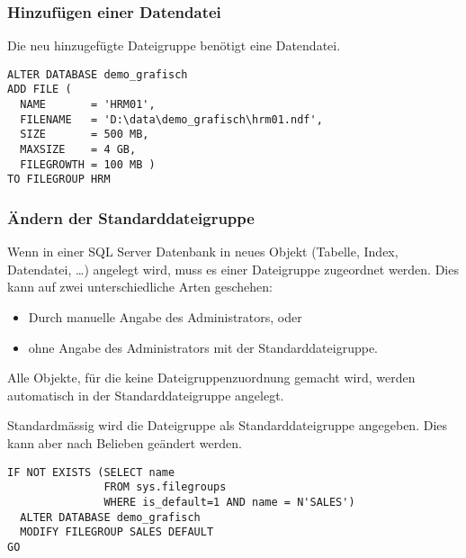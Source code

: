         \subsubsection{Hinzufügen einer Datendatei}
          Die neu hinzugefügte Dateigruppe  benötigt eine
          Datendatei.
          \begin{lstlisting}[language=ms_sql,caption={Eine
          Datendatei einer Dateigruppe hinzufügen},label=admin03_13]
ALTER DATABASE demo_grafisch
ADD FILE ( 
  NAME       = 'HRM01', 
  FILENAME   = 'D:\data\demo_grafisch\hrm01.ndf', 
  SIZE       = 500 MB, 
  MAXSIZE    = 4 GB, 
  FILEGROWTH = 100 MB ) 
TO FILEGROUP HRM
          \end{lstlisting}
          \begin{literaturinternet}
            \item \cite{bb522469}
          \end{literaturinternet}
        \subsubsection{Ändern der Standarddateigruppe}
          Wenn in einer SQL Server Datenbank in neues Objekt (Tabelle, Index,
          Datendatei, \ldots) angelegt wird, muss es einer Dateigruppe
          zugeordnet werden. Dies kann auf zwei unterschiedliche Arten
          geschehen:
          \begin{itemize}
              \item Durch manuelle Angabe des Administrators, oder
              \item ohne Angabe des Administrators mit der Standarddateigruppe.
          \end{itemize}
          \begin{merke}
            Alle Objekte, für die keine Dateigruppenzuordnung gemacht wird,
            werden automatisch in der Standarddateigruppe angelegt.
          \end{merke}
          Standardmässig wird die Dateigruppe  als
          Standarddateigruppe angegeben. Dies kann aber nach Belieben geändert
          werden.
\clearpage
          \begin{lstlisting}[language=ms_sql,caption={Ändern
          der Standarddateigruppe},label=admin03_14]
IF NOT EXISTS (SELECT name 
               FROM sys.filegroups 
               WHERE is_default=1 AND name = N'SALES')
  ALTER DATABASE demo_grafisch
  MODIFY FILEGROUP SALES DEFAULT
GO
          \end{lstlisting}
